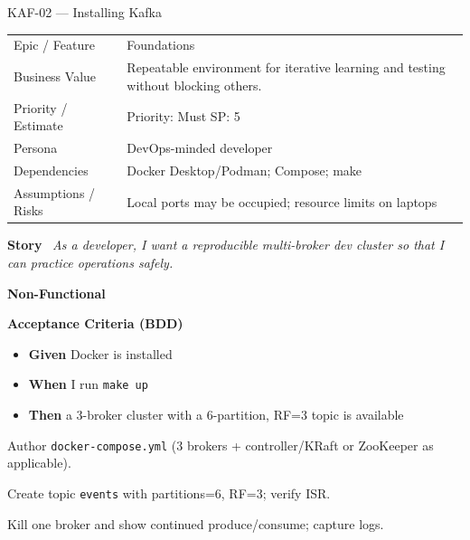 \documentclass[11pt,a4paper]{article}
\newcommand{\Field}[2]{\textbf{#1}~#2}
\begin{document}
\begin{StoryCardBox}{KAF-02 --- Installing Kafka}
\begin{tabularx}{\linewidth}{LY}
 Epic / Feature & Foundations \\
 Business Value & Repeatable environment for iterative learning and testing without blocking others. \\
 Priority / Estimate & Priority: Must \quad SP: 5 \\
 Persona & DevOps-minded developer \\
 Dependencies & Docker Desktop/Podman; Compose; make \\
 Assumptions / Risks & Local ports may be occupied; resource limits on laptops \\
\end{tabularx}

\medskip
\Field{Story}{\; \emph{As a developer, I want a reproducible multi-broker dev cluster so that I can practice operations safely.}}

\medskip
\Field{Non-Functional}{\; \; }

\medskip
\Field{Acceptance Criteria (BDD)}{}
\begin{itemize}[leftmargin=1.2em, itemsep=1pt]
  \item \textbf{Given} Docker is installed
  \item \textbf{When} I run \texttt{make up}
  \item \textbf{Then} a 3-broker cluster with a 6-partition, RF=3 topic is available
\end{itemize}

\begin{TasksBox}
\begin{tasklist}
  \item Author \texttt{docker-compose.yml} (3 brokers + controller/KRaft or ZooKeeper as applicable).
  \item Create topic \texttt{events} with partitions=6, RF=3; verify ISR.
  \item Kill one broker and show continued produce/consume; capture logs.
\end{tasklist}
\end{TasksBox}
\end{StoryCardBox}
\clearpage
\end{document}
